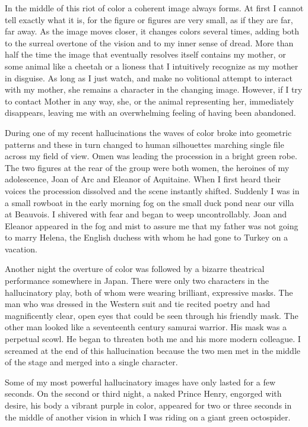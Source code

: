 \documentclass[]{article}
\begin{document}
In the middle of this riot of color a coherent image always forms. At first I cannot tell exactly what it is, for the figure or figures are very small, as if they are far, far away. As the image moves closer, it changes colors several times, adding both to the surreal overtone of the vision and to my inner sense of dread. More than half the time the image that eventually resolves itself contains my mother, or some animal like a cheetah or a lioness that I intuitively recognize as my mother in disguise. As long as I just watch, and make no volitional attempt to interact with my mother, she remains a character in the changing image. However, if I try to contact Mother in any way, she, or the animal representing her, immediately disappears, leaving me with an overwhelming feeling of having been abandoned.

During one of my recent hallucinations the waves of color broke into geometric patterns and these in turn changed to human silhouettes marching single file across my field of view. Omen was leading the procession in a bright green robe. The two figures at the rear of the group were both women, the heroines of my adolescence, Joan of Arc and Eleanor of Aquitaine. When I first heard their voices the procession dissolved and the scene instantly shifted. Suddenly I was in a small rowboat in the early morning fog on the small duck pond near our villa at Beauvois. I shivered with fear and began to weep uncontrollably. Joan and Eleanor appeared in the fog and mist to assure me that my father was not going to marry Helena, the English duchess with whom he had gone to Turkey on a vacation.

Another night the overture of color was followed by a bizarre theatrical performance somewhere in Japan. There were only two characters in the hallucinatory play, both of whom were wearing brilliant, expressive masks. The man who was dressed in the Western suit and tie recited poetry and had magnificently clear, open eyes that could be seen through his friendly mask. The other man looked like a seventeenth century samurai warrior. His mask was a perpetual scowl. He began to threaten both me and his more modern colleague. I screamed at the end of this hallucination because the two men met in the middle of the stage and merged into a single character.

Some of my most powerful hallucinatory images have only lasted for a few seconds. On the second or third night, a naked Prince Henry, engorged with desire, his body a vibrant purple in color, appeared for two or three seconds in the middle of another vision in which I was riding on a giant green octospider.
\end{document}

